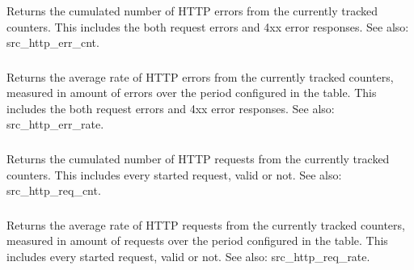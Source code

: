 \subsubsection[sc1\_http\_err\_cnt]{}
\subsubsection[sc2\_http\_err\_cnt]{}
  Returns the cumulated number of HTTP errors from the currently tracked
  counters. This includes the both request errors and 4xx error responses.
  See also: src\_http\_err\_cnt.

\subsubsection[sc1\_http\_err\_rate]{}
\subsubsection[sc2\_http\_err\_rate]{}
  Returns the average rate of HTTP errors from the currently tracked counters,
  measured in amount of errors over the period configured in the table. This
  includes the both request errors and 4xx error responses. See also:   src\_http\_err\_rate.

\subsubsection[sc1\_http\_req\_cnt]{}
\subsubsection[sc2\_http\_req\_cnt]{}
  Returns the cumulated number of HTTP requests from the currently tracked
  counters. This includes every started request, valid or not. See also:   src\_http\_req\_cnt.

\subsubsection[sc1\_http\_req\_rate]{}
\subsubsection[sc2\_http\_req\_rate]{}
  Returns the average rate of HTTP requests from the currently tracked
  counters, measured in amount of requests over the period configured in
  the table. This includes every started request, valid or not. See also:   src\_http\_req\_rate.

